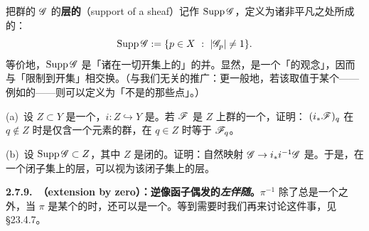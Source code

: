 \begin{definition}\label{thm:support-of-sheaf}
把群的\trSheaf{} $\mathscr{G}$ 的\textbf{层的\trSupport{}}（support of a sheaf）记作 $\operatorname{Supp}\mathscr{G}$，定义为诸\trStalk{}非平凡之处所成的\trLocus{}：
\[
\operatorname{Supp}\mathscr{G}:=\{p\in X\ :\ |\mathscr{G}_p|\neq 1\}.
\]
等价地，$\operatorname{Supp}\mathscr{G}$ 是「诸\trSection{}在一切开集上的\trSupport{}」的并。显然，\trSupport{}是一个「\trStalkLocal{}的观念」，因而与「限制到开集」相交换。（与我们无关的推广：更一般地，若该\trSheaf{}取值于某个\trCategory{}——例如\trSet{}的\trCategory——则\trSupport{}可以定义为「\trStalk{}不是\trFinalObject{}的那些点」。）
\end{definition}

\begin{exercise}\label{ex:sheaf-supported-on-closed}
(a)~设 $Z\subset Y$ 是一个\trClosedSubset，$i\colon Z\hookrightarrow Y$ 是\trInclusionMap{}。若 $\mathscr{F}$ 是 $Z$ 上群的一个\trSheaf，证明：\trStalk{} $(i_*\mathscr{F})_q$ 在 $q\notin Z$ 时是仅含一个元素的群，在 $q\in Z$ 时等于 $\mathscr{F}_q$。

(b)~设 $\operatorname{Supp}\mathscr{G}\subset Z$，其中 $Z$ 是闭的。证明：自然映射 $\mathscr{G}\to i_*i^{-1}\mathscr{G}$ 是\trIsomorphism。于是，\trSupport{}在一个闭子集上的层，可以视为该闭子集上的层。
\end{exercise}

\textbf{2.7.9.\ \trExtensionByZero（extension by zero）：逆像函子偶发的\emph{左伴随}。}\quad $\pi^{-1}$ 除了总是一个\trLeftAdjoint{}之外，当 $\pi$ 是某个\trOpenSubset{}的\trInclusionMap{}时，还可以是一个\trRightAdjoint。等到需要时我们再来讨论这件事，见 \S23.4.7。
